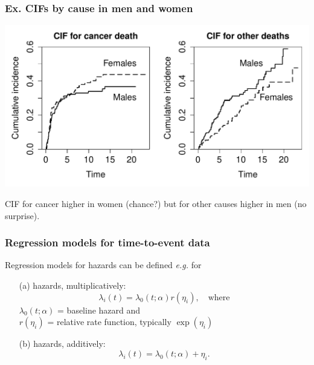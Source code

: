 \documentclass[handout,12pt,dvipsnames,t]{beamer}
\begin{document}
\begin{frame}[fragile]
\frametitle{Ex. CIFs by cause in men and women}

\includegraphics[width=\textwidth]{orcaCI2}

CIF for cancer higher in women (chance?) but for other causes
higher in men (no surprise).

\end{frame}

\begin{frame}

\frametitle{Regression models for time-to-event data}


Regression models for hazards can be defined \textit{e.g.} for 
\begin{itemize}
\item[(a)] hazards, multiplicatively: $$ 
\lambda_i(t) = \lambda_0(t; \alpha) r(\eta_i), \quad\text{where}$$
$\lambda_0(t; \alpha)$ = baseline hazard and \\
$r(\eta_i)$ = relative rate function, typically $\exp(\eta_i)$
\medskip
\pause
\item[(b)] hazards, additively: 
$$ \lambda_i(t) = \lambda_0(t; \alpha) + \eta_i. $$
\end{itemize}
\end{frame}
\end{document}
